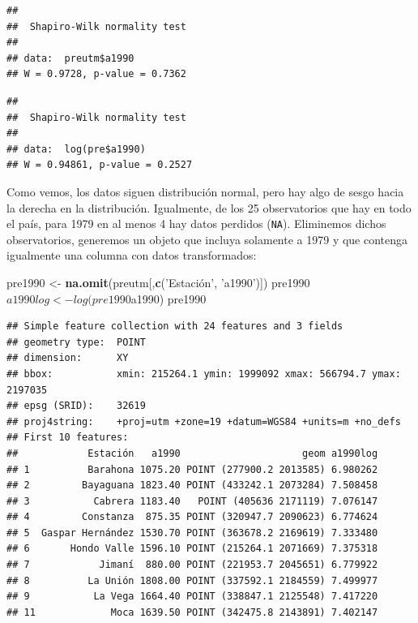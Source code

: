 \documentclass[11pt,]{article}
\newenvironment{Shaded}{\begin{snugshade}}{\end{snugshade}}
\newcommand{\KeywordTok}[1]{\textcolor[rgb]{0.13,0.29,0.53}{\textbf{#1}}}
\newcommand{\StringTok}[1]{\textcolor[rgb]{0.31,0.60,0.02}{#1}}
\newcommand{\OperatorTok}[1]{\textcolor[rgb]{0.81,0.36,0.00}{\textbf{#1}}}
\newcommand{\NormalTok}[1]{#1}
\begin{document}
\begin{Shaded}
\end{Shaded}

\begin{verbatim}
## 
##  Shapiro-Wilk normality test
## 
## data:  preutm$a1990
## W = 0.9728, p-value = 0.7362
\end{verbatim}

\begin{Shaded}
\end{Shaded}

\begin{verbatim}
## 
##  Shapiro-Wilk normality test
## 
## data:  log(pre$a1990)
## W = 0.94861, p-value = 0.2527
\end{verbatim}

Como vemos, los datos siguen distribución normal, pero hay algo de sesgo
hacia la derecha en la distribución. Igualmente, de los 25 observatorios
que hay en todo el país, para 1979 en al menos 4 hay datos perdidos
(\texttt{NA}). Eliminemos dichos observatorios, generemos un objeto que
incluya solamente a 1979 y que contenga igualmente una columna con datos
transformados:

\begin{Shaded}
\begin{Highlighting}[]
\NormalTok{pre1990 <-}\StringTok{ }\KeywordTok{na.omit}\NormalTok{(preutm[,}\KeywordTok{c}\NormalTok{(}\StringTok{'Estación', '}\NormalTok{a1990}\StringTok{')])}
\StringTok{pre1990$a1990log <- log(pre1990$a1990)}
\StringTok{pre1990}
\end{Highlighting}
\end{Shaded}

\begin{verbatim}
## Simple feature collection with 24 features and 3 fields
## geometry type:  POINT
## dimension:      XY
## bbox:           xmin: 215264.1 ymin: 1999092 xmax: 566794.7 ymax: 2197035
## epsg (SRID):    32619
## proj4string:    +proj=utm +zone=19 +datum=WGS84 +units=m +no_defs
## First 10 features:
##            Estación   a1990                     geom a1990log
## 1          Barahona 1075.20 POINT (277900.2 2013585) 6.980262
## 2         Bayaguana 1823.40 POINT (433242.1 2073284) 7.508458
## 3           Cabrera 1183.40   POINT (405636 2171119) 7.076147
## 4         Constanza  875.35 POINT (320947.7 2090623) 6.774624
## 5  Gaspar Hernández 1530.70 POINT (363678.2 2169619) 7.333480
## 6       Hondo Valle 1596.10 POINT (215264.1 2071669) 7.375318
## 7            Jimaní  880.00 POINT (221953.7 2045651) 6.779922
## 8          La Unión 1808.00 POINT (337592.1 2184559) 7.499977
## 9           La Vega 1664.40 POINT (338847.1 2125548) 7.417220
## 11             Moca 1639.50 POINT (342475.8 2143891) 7.402147
\end{verbatim}
\end{document}
